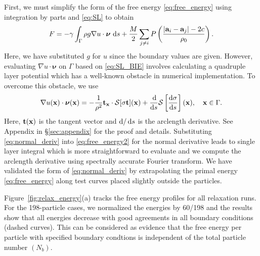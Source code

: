 \documentclass[prb,preprint,showpacs,preprintnumbers,amsmath,amssymb,longbibliography]{revtex4-1}
\renewcommand{\aa}{\mathbf{a}}
\newcommand{\DD}{\mathcal{D}}
\newcommand{\SSS}{\mathcal{S}}
\newcommand{\nnu}{\boldsymbol{\nu}}
\newcommand{\xx}{\mathbf{x}}
\begin{document}
First, we must simplify the
form of the free energy \eqref{eq:free_energy}
using integration by parts and \eqref{eq:SL}
to obtain
\begin{equation}
\label{eq:free_energy2}
F = -\gamma
\int_{\Gamma} \rho g \nabla u \cdot \nnu \,\dif s
+ \frac{M}{2}
\sum_{j \neq i} 
P\left(\frac{|\aa_i - \aa_j|-2c}{\rho_0}\right).
\end{equation}
%
Here, we have substituted $g$ for $u$ since the boundary values are given.
However, evaluating $\nabla u \cdot \nnu$ on $\Gamma$ based on \eqref{eq:SL_BIE}
involves calculating a quadruple layer potential which has a
well-known obstacle in numerical implementation.
To overcome this obstacle, we use
%
\begin{equation}
\label{eq:normal_deriv}
\nabla u(\xx) \cdot \nnu(\xx)=
-\frac{1}{\rho^2} {\bf t}_\xx\cdot \SSS[\sigma{\bf t}](\xx)
+ \frac{\dif}{\dif s}\SSS\left[\frac{\dif \sigma}{\dif s}\right](\xx), \quad \xx \in \Gamma.
\end{equation}
%
Here, ${\bf t}(\xx)$ is the tangent vector and $\dif/\dif s$ is the arclength derivative.
See Appendix in \S\ref{sec:appendix} for the proof and details.
Substituting \eqref{eq:normal_deriv} into \eqref{eq:free_energy2} for the normal derivative
leads to single layer integral which is more straightforward to evaluate and we compute the
arclength derivative using spectrally accurate Fourier transform.
We have validated the form of \eqref{eq:normal_deriv} by extrapolating 
the primal energy \eqref{eq:free_energy} along test curves placed slightly
outside the particles. 

Figure~\ref{fig:relax_energy}(a) tracks the free energy profiles for all relaxation runs.
For the 198-particle cases, we normalized the energies by 60/198 and the results
show that all energies decrease with good agreements in all boundary conditions (dashed curves).
This can be considered as evidence that the free energy per particle with specified
boundary condtions is independent of the total particle number $(N_b)$.
\end{document}

